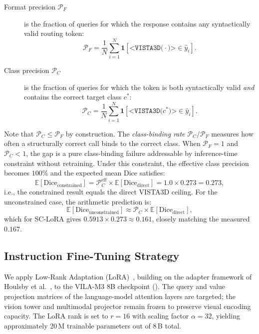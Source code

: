 \documentclass[lineno,referee,pdflatex,sn-mathphys-num]{sn-jnl}
\begin{document}
\begin{description}
  \item[Format precision $\mathcal{P}_F$] is the fraction of queries
    for which the response contains any syntactically valid routing
    token:
    \[
      \mathcal{P}_F = \frac{1}{N}\sum_{i=1}^N
        \mathbf{1}\!\left[\texttt{<VISTA3D(}\cdot\texttt{)>} \in \hat{y}_i\right].
    \]
  \item[Class precision $\mathcal{P}_C$] is the fraction of queries
    for which the token is both syntactically valid \emph{and} contains
    the correct target class $c^*$:
    \[
      \mathcal{P}_C = \frac{1}{N}\sum_{i=1}^N
        \mathbf{1}\!\left[\texttt{<VISTA3D(}c^*\texttt{)>} \in \hat{y}_i\right].
    \]
\end{description}

Note that $\mathcal{P}_C \leq \mathcal{P}_F$ by construction. The
\emph{class-binding rate} $\mathcal{P}_C / \mathcal{P}_F$ measures how
often a structurally correct call binds to the correct class.
When $\mathcal{P}_F = 1$ and $\mathcal{P}_C < 1$, the gap is a pure
class-binding failure addressable by inference-time constraint without
retraining. Under this constraint, the effective class precision becomes
$100\%$ and the expected mean Dice satisfies:
\[
  \mathbb{E}[\mathrm{Dice}_{\text{constrained}}]
  = \mathcal{P}_C^{\text{eff}} \times \mathbb{E}[\mathrm{Dice}_{\text{direct}}]
  = 1.0 \times 0.273 = 0.273,
\]
i.e., the constrained result equals the direct VISTA3D ceiling. For the
unconstrained case, the arithmetic prediction is:
\[
  \mathbb{E}[\mathrm{Dice}_{\text{unconstrained}}]
  \approx \mathcal{P}_C \times \mathbb{E}[\mathrm{Dice}_{\text{direct}}],
\]
which for SC-LoRA gives $0.5913 \times 0.273 \approx 0.161$, closely
matching the measured $0.167$.

\subsection{Instruction Fine-Tuning Strategy}

We apply Low-Rank Adaptation (LoRA)~\cite{lora2022}, building on the
adapter framework of Houlsby et al.~\cite{houlsby2019}, to the VILA-M3
8B checkpoint (). The query and value
projection matrices of the language-model attention layers are targeted;
the vision tower and multimodal projector remain frozen to preserve
visual encoding capacity. The LoRA rank is set to $r = 16$ with scaling
factor $\alpha = 32$, yielding approximately 20\,M trainable parameters
out of 8\,B total.
\end{document}
